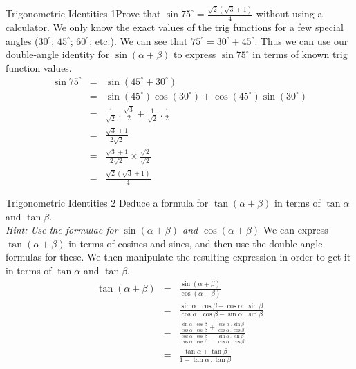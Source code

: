 \begin{wex}{Trigonometric Identities 1}{Prove that $\sin 75^\circ=\frac{\sqrt{2}(\sqrt{3}+1)}{4}$ without using a calculator.}
{
We only know the exact values of the trig functions for a few special angles ($30^\circ$; $45^\circ$; $60^\circ$; etc.). We can see that $75^\circ=30^\circ+45^\circ$. Thus we can use our double-angle identity for $\sin(\alpha+\beta)$ to express $\sin 75^\circ$ in terms of known trig function values.
\begin{eqnarray*}
\sin 75^\circ&=&\sin(45^\circ+30^\circ)\\
&=&\sin(45^\circ)\cos(30^\circ)+\cos(45^\circ)\sin(30^\circ)\\
&=&\frac{1}{\sqrt{2}}\,.\,\frac{\sqrt{3}}{2}+\frac{1}{\sqrt{2}}\,.\,\frac{1}{2}\\\
&=&\frac{\sqrt{3}+1}{2\sqrt{2}}\\
&=&\frac{\sqrt{3}+1}{2\sqrt{2}}\times\frac{\sqrt{2}}{\sqrt{2}}\\
&=&\frac{\sqrt{2}(\sqrt{3}+1)}{4}
\end{eqnarray*}
}
\end{wex}

\begin{wex}{Trigonometric Identities 2}
{Deduce a formula for $\tan(\alpha+\beta)$ in terms of $\tan\alpha$ and $\tan\beta$.\\
\emph{Hint: Use the formulae for $\sin(\alpha+\beta)$ and $\cos(\alpha+\beta)$} }
{
We can express $\tan(\alpha+\beta)$ in terms of cosines and sines, and then use the double-angle formulas for these. We then manipulate the resulting expression in order to get it in terms of $\tan\alpha$ and $\tan\beta$.
\westep{Execute strategy}
\begin{eqnarray*}
\tan(\alpha+\beta)&=&\frac{\sin(\alpha+\beta)}{\cos(\alpha+\beta)}\\
&=&\frac{\sin\alpha\,.\,\cos\beta+\cos\alpha\,.\,\sin\beta}{\cos\alpha\,.\,\cos\beta-\sin\alpha\,.\,\sin\beta}\\
&=&\frac{\frac{\sin\alpha\,.\,\cos\beta}{\cos\alpha\,.\,\cos\beta}+\frac{\cos\alpha\,.\,\sin\beta}{\cos\alpha\,.\,\cos\beta}}{\frac{\cos\alpha\,.\,\cos\beta}{\cos\alpha\,.\,\cos\beta}-\frac{\sin\alpha\,.\,\sin\beta}{\cos\alpha\,.\,\cos\beta}}\\
&=& \frac{\tan\alpha+\tan\beta}{1-\tan\alpha\,.\,\tan\beta}
\end{eqnarray*}
}
\end{wex}

